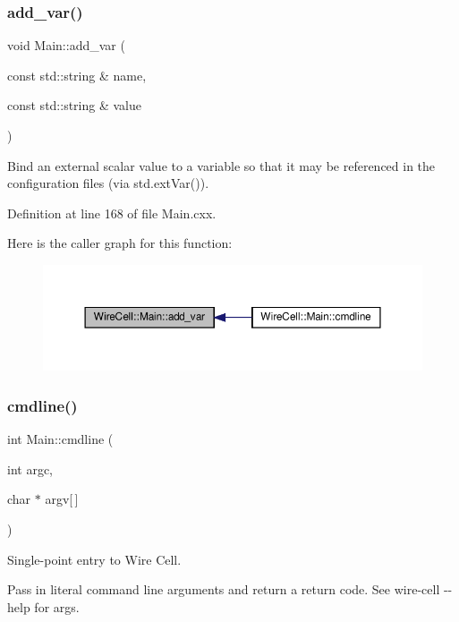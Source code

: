 \subsubsection{\texorpdfstring{add\+\_\+var()}{add\_var()}}
{\footnotesize\ttfamily void Main\+::add\+\_\+var (\begin{DoxyParamCaption}\item[{const std\+::string \&}]{name,  }\item[{const std\+::string \&}]{value }\end{DoxyParamCaption})}

Bind an external scalar value to a variable so that it may be referenced in the configuration files (via std.\+ext\+Var()). 

Definition at line 168 of file Main.\+cxx.

Here is the caller graph for this function\+:
\nopagebreak
\begin{figure}[H]
\begin{center}
\leavevmode
\includegraphics[width=350pt]{class_wire_cell_1_1_main_a6c37e436a63876d242172070198e3192_icgraph}
\end{center}
\end{figure}
\mbox{\label{class_wire_cell_1_1_main_a6d6b47f6893cc6474d71d70bf5f8adcb}} 
\subsubsection{\texorpdfstring{cmdline()}{cmdline()}}
{\footnotesize\ttfamily int Main\+::cmdline (\begin{DoxyParamCaption}\item[{int}]{argc,  }\item[{char $\ast$}]{argv\mbox{[}$\,$\mbox{]} }\end{DoxyParamCaption})}

Single-\/point entry to Wire Cell.

Pass in literal command line arguments and return a return code. See {\ttfamily wire-\/cell -\/-\/help} for args.

